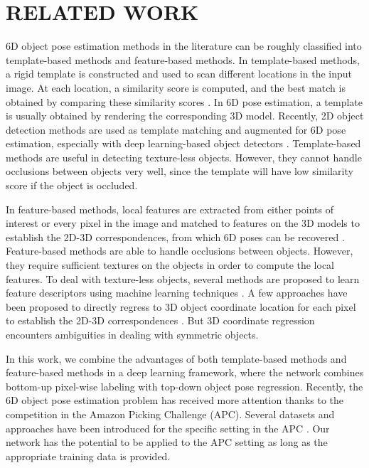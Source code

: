 \documentclass[conference]{IEEEtran}
\begin{document}
\section{RELATED WORK}

6D object pose estimation methods in the literature can be roughly classified into template-based methods and feature-based methods. In template-based methods, a rigid template is constructed and used to scan different locations in the input image. At each location, a similarity score is computed, and the best match is obtained by comparing these similarity scores \cite{hinterstoisser2012gradient,hinterstoisser2012model,cao2016real}. In 6D pose estimation, a template is usually obtained by rendering the corresponding 3D model. Recently, 2D object detection methods are used as template matching and augmented for 6D pose estimation, especially with deep learning-based object detectors \cite{su2015render,rad2017bb8,kehl2017ssd,tekin2017real}. Template-based methods are useful in detecting texture-less objects. However, they cannot handle occlusions between objects very well, since the template will have low similarity score if the object is occluded.

In feature-based methods, local features are extracted from either points of interest or every pixel in the image and matched to features on the 3D models to establish the 2D-3D correspondences, from which 6D poses can be recovered \cite{lowe1999object,rothganger20063d,tulsiani2015viewpoints,pavlakos2017}. Feature-based methods are able to handle occlusions between objects. However, they require sufficient textures on the objects in order to compute the local features. To deal with texture-less objects, several methods are proposed to learn feature descriptors using machine learning techniques \cite{wohlhart2015learning,doumanoglou2016siamese}. A few approaches have been proposed to directly regress to 3D object coordinate location for each pixel to establish the 2D-3D correspondences \cite{brachmann2014learning,krull2015learning,brachmann2016uncertainty}. But 3D coordinate regression encounters ambiguities in dealing with symmetric objects.

In this work, we combine the advantages of both template-based methods and feature-based methods in a deep learning framework, where the network combines bottom-up pixel-wise labeling with top-down object pose regression. Recently, the 6D object pose estimation problem has received more attention thanks to the competition in the Amazon Picking Challenge (APC). Several datasets and approaches have been introduced for the specific setting in the APC \cite{rennie2016dataset,zeng2017multi}. Our network has the potential to be applied to the APC setting as long as the appropriate training data is provided.
\end{document}
